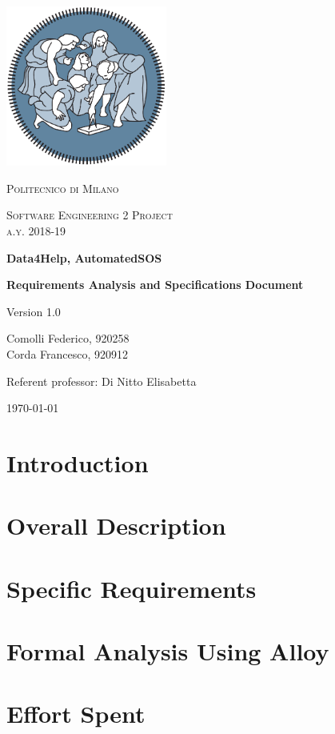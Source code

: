 \documentclass{report}
\author{Federico Comolli
        \and
        Francesco Corda}
\date{October 2018}
\begin{document}
\begin{titlepage}
	\centering
	\includegraphics[width=150pt]{images/polimi_logo}\par\vspace{1cm}
	{\scshape\LARGE
		Politecnico di Milano\par}
	\vspace{1cm}
	{\scshape\Large
		Software Engineering 2 Project\\
		a.y. 2018-19\par}
	\vspace{1.5cm}
	{\huge\bfseries
		Data4Help, AutomatedSOS\\\par}
	{\Large\bfseries
		Requirements Analysis and Specifications Document\par}
	Version 1.0\par
	\vspace{2cm}
	{\Large
		Comolli Federico, 920258\\
	    Corda Francesco, 920912\par}
	\vfill
	Referent professor: Di Nitto Elisabetta\par
	\vfill
	{\large\today\par}
\end{titlepage}


\renewcommand{\contentsname}{Table of Contents}
\tableofcontents


\chapter{Introduction}


\chapter{Overall Description}


\chapter{Specific Requirements}


\chapter{Formal Analysis Using Alloy}


\chapter{Effort Spent}
 



\end{document}
